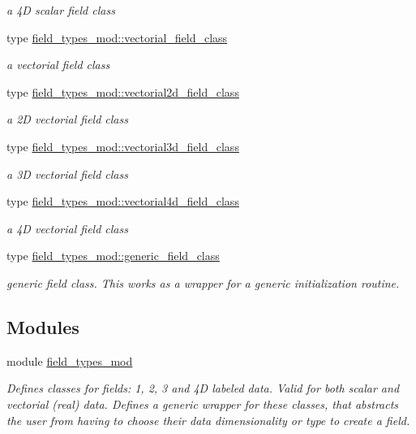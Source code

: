 \begin{DoxyCompactItemize}
\begin{DoxyCompactList}\small\item\em a 4D scalar field class \end{DoxyCompactList}\item 
type \mbox{\hyperlink{structfield__types__mod_1_1vectorial__field__class}{field\+\_\+types\+\_\+mod\+::vectorial\+\_\+field\+\_\+class}}
\begin{DoxyCompactList}\small\item\em a vectorial field class \end{DoxyCompactList}\item 
type \mbox{\hyperlink{structfield__types__mod_1_1vectorial2d__field__class}{field\+\_\+types\+\_\+mod\+::vectorial2d\+\_\+field\+\_\+class}}
\begin{DoxyCompactList}\small\item\em a 2D vectorial field class \end{DoxyCompactList}\item 
type \mbox{\hyperlink{structfield__types__mod_1_1vectorial3d__field__class}{field\+\_\+types\+\_\+mod\+::vectorial3d\+\_\+field\+\_\+class}}
\begin{DoxyCompactList}\small\item\em a 3D vectorial field class \end{DoxyCompactList}\item 
type \mbox{\hyperlink{structfield__types__mod_1_1vectorial4d__field__class}{field\+\_\+types\+\_\+mod\+::vectorial4d\+\_\+field\+\_\+class}}
\begin{DoxyCompactList}\small\item\em a 4D vectorial field class \end{DoxyCompactList}\item 
type \mbox{\hyperlink{structfield__types__mod_1_1generic__field__class}{field\+\_\+types\+\_\+mod\+::generic\+\_\+field\+\_\+class}}
\begin{DoxyCompactList}\small\item\em generic field class. This works as a wrapper for a generic initialization routine. \end{DoxyCompactList}\end{DoxyCompactItemize}
\subsection*{Modules}
\begin{DoxyCompactItemize}
\item 
module \mbox{\hyperlink{namespacefield__types__mod}{field\+\_\+types\+\_\+mod}}
\begin{DoxyCompactList}\small\item\em Defines classes for \textquotesingle{}fields\textquotesingle{}\+: 1, 2, 3 and 4D labeled data. Valid for both scalar and vectorial (real) data. Defines a generic wrapper for these classes, that abstracts the user from having to choose their data dimensionality or type to create a field. \end{DoxyCompactList}\end{DoxyCompactItemize}
